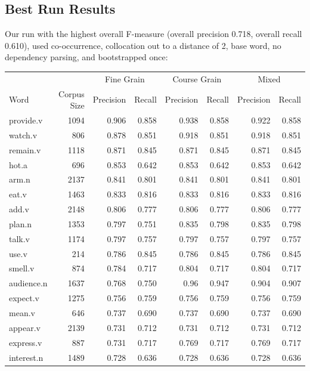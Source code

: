 \documentclass{article}
\begin{document}
\subsection{Best Run Results}

Our run with the highest overall F-measure (overall precision 0.718, overall
recall 0.610), used co-occurrence, collocation out to a distance of 2, base word,
no dependency parsing, and bootstrapped once:
\newpage
\begin{longtable}{l | r r r r r r r}
		&	&	\multicolumn{2}{c}{Fine Grain}	&	\multicolumn{2}{c}{Course Grain}	&	\multicolumn{2}{c}{Mixed}\\
Word	&	Corpus Size	&	Precision	&	Recall	&	Precision	&	Recall	&	Precision	&	Recall\\
\hline
provide.v   	&	1094	&	0.906	&	0.858	&	0.938	&	0.858	&	0.922	&	0.858\\
watch.v     	&	806 	&	0.878	&	0.851	&	0.918	&	0.851	&	0.918	&	0.851\\
remain.v    	&	1118	&	0.871	&	0.845	&	0.871	&	0.845	&	0.871	&	0.845\\
hot.a       	&	696 	&	0.853	&	0.642	&	0.853	&	0.642	&	0.853	&	0.642\\
arm.n       	&	2137	&	0.841	&	0.801	&	0.841	&	0.801	&	0.841	&	0.801\\
eat.v       	&	1463	&	0.833	&	0.816	&	0.833	&	0.816	&	0.833	&	0.816\\
add.v       	&	2148	&	0.806	&	0.777	&	0.806	&	0.777	&	0.806	&	0.777\\
plan.n      	&	1353	&	0.797	&	0.751	&	0.835	&	0.798	&	0.835	&	0.798\\
talk.v      	&	1174	&	0.797	&	0.757	&	0.797	&	0.757	&	0.797	&	0.757\\
use.v       	&	214 	&	0.786	&	0.845	&	0.786	&	0.845	&	0.786	&	0.845\\
smell.v     	&	874 	&	0.784	&	0.717   &	0.804	&	0.717   &	0.804	&	0.717\\
audience.n    	&	1637	&	0.768	&	0.750	&	0.96	&	0.947	&	0.904	&	0.907\\
expect.v    	&	1275	&	0.756	&	0.759	&	0.756	&	0.759	&	0.756	&	0.759\\
mean.v      	&	646 	&	0.737	&	0.690	&	0.737	&	0.690	&	0.737	&	0.690\\
appear.v    	&	2139	&	0.731	&	0.712	&	0.731	&	0.712	&	0.731	&	0.712\\
express.v    	&	887 	&	0.731	&	0.717   &	0.769	&	0.717   &	0.769	&	0.717\\
interest.n    	&	1489	&	0.728	&	0.636	&	0.728	&	0.636	&	0.728	&	0.636\\

\end{longtable}
\end{document}
